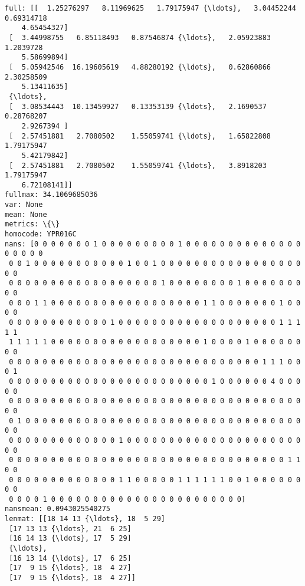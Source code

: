 \documentclass[11pt]{article}
\begin{document}
    \begin{Verbatim}[commandchars=\\\{\}]
full: [[  1.25276297   8.11969625   1.79175947 {\ldots},   3.04452244   0.69314718
    4.65454327]
 [  3.44998755   6.85118493   0.87546874 {\ldots},   2.05923883   1.2039728
    5.58699894]
 [  5.05942546  16.19605619   4.88280192 {\ldots},   0.62860866   2.30258509
    5.13411635]
 {\ldots}, 
 [  3.08534443  10.13459927   0.13353139 {\ldots},   2.1690537    0.28768207
    2.9267394 ]
 [  2.57451881   2.7080502    1.55059741 {\ldots},   1.65822808   1.79175947
    5.42179842]
 [  2.57451881   2.7080502    1.55059741 {\ldots},   3.8918203    1.79175947
    6.72108141]]
fullmax: 34.1069685036
var: None
mean: None
metrics: \{\}
homocode: YPR016C
nans: [0 0 0 0 0 0 0 1 0 0 0 0 0 0 0 0 0 1 0 0 0 0 0 0 0 0 0 0 0 0 0 0 0 0 0 0 0
 0 0 1 0 0 0 0 0 0 0 0 0 0 0 1 0 0 1 0 0 0 0 0 0 0 0 0 0 0 0 0 0 0 0 0 0 0
 0 0 0 0 0 0 0 0 0 0 0 0 0 0 0 0 0 0 1 0 0 0 0 0 0 0 0 1 0 0 0 0 0 0 0 0 0
 0 0 0 1 1 0 0 0 0 0 0 0 0 0 0 0 0 0 0 0 0 0 0 1 1 0 0 0 0 0 0 0 1 0 0 0 0
 0 0 0 0 0 0 0 0 0 0 0 0 1 0 0 0 0 0 0 0 0 0 0 0 0 0 0 0 0 0 0 0 1 1 1 1 1
 1 1 1 1 1 0 0 0 0 0 0 0 0 0 0 0 0 0 0 0 0 0 0 1 0 0 0 0 1 0 0 0 0 0 0 0 0
 0 0 0 0 0 0 0 0 0 0 0 0 0 0 0 0 0 0 0 0 0 0 0 0 0 0 0 0 0 0 1 1 1 0 0 0 1
 0 0 0 0 0 0 0 0 0 0 0 0 0 0 0 0 0 0 0 0 0 0 0 0 1 0 0 0 0 0 0 4 0 0 0 0 0
 0 0 0 0 0 0 0 0 0 0 0 0 0 0 0 0 0 0 0 0 0 0 0 0 0 0 0 0 0 0 0 0 0 0 0 0 0
 0 1 0 0 0 0 0 0 0 0 0 0 0 0 0 0 0 0 0 0 0 0 0 0 0 0 0 0 0 0 0 0 0 0 0 0 0
 0 0 0 0 0 0 0 0 0 0 0 0 0 1 0 0 0 0 0 0 0 0 0 0 0 0 0 0 0 0 0 0 0 0 0 0 0
 0 0 0 0 0 0 0 0 0 0 0 0 0 0 0 0 0 0 0 0 0 0 0 0 0 0 0 0 0 0 0 0 0 1 1 0 0
 0 0 0 0 0 0 0 0 0 0 0 0 0 1 1 0 0 0 0 0 1 1 1 1 1 1 0 0 1 0 0 0 0 0 0 0 0
 0 0 0 0 1 0 0 0 0 0 0 0 0 0 0 0 0 0 0 0 0 0 0 0 0 0 0 0]
nansmean: 0.0943025540275
lenmat: [[18 14 13 {\ldots}, 18  5 29]
 [17 13 13 {\ldots}, 21  6 25]
 [16 14 13 {\ldots}, 17  5 29]
 {\ldots}, 
 [16 13 14 {\ldots}, 17  6 25]
 [17  9 15 {\ldots}, 18  4 27]
 [17  9 15 {\ldots}, 18  4 27]]

\end{Verbatim}
\end{document}
